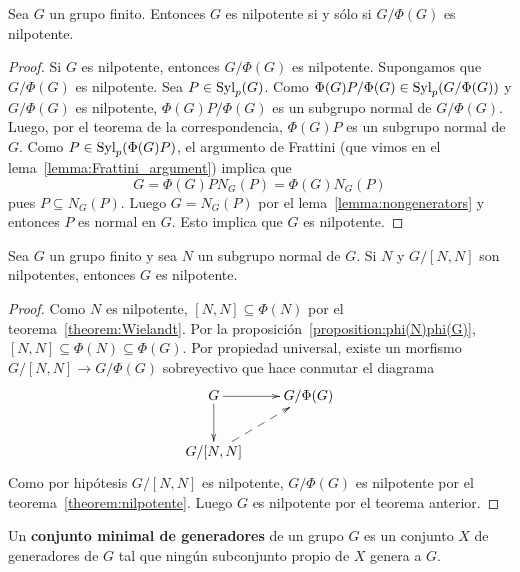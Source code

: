 \begin{theorem}
	\label{theorem:G/phi(G)}
	Sea $G$ un grupo finito. Entonces $G$ es nilpotente si y sólo si
	$G/\Phi(G)$ es nilpotente.
\end{theorem}
\begin{proof}
	Si $G$ es nilpotente, entonces $G/\Phi(G)$ es nilpotente. Supongamos que $G/\Phi(G)$ es
	nilpotente. Sea $P\in\mathrm{Syl}_p(G)$. Como
	$\Phi(G)P/\Phi(G)\in\mathrm{Syl}_p(G/\Phi(G))$ y $G/\Phi(G)$ es nilpotente,
	$\Phi(G)P/\Phi(G)$ es un subgrupo normal de $G/\Phi(G)$. Luego, por el
	teorema de la correspondencia, $\Phi(G)P$ es un subgrupo normal de $G$.
	Como $P\in\mathrm{Syl}_p(\Phi(G)P)$, el argumento de Frattini 
	(que vimos en el lema~\ref{lemma:Frattini_argument}) implica que
	\[
		G=\Phi(G)PN_G(P)=\Phi(G)N_G(P)
	\]
	pues $P\subseteq N_G(P)$. Luego $G=N_G(P)$ por el
	lema~\ref{lemma:nongenerators} y entonces $P$ es normal en $G$. Esto
	implica que $G$ es nilpotente.
\end{proof}

\begin{theorem}[Hall]
	\label{theorem:Hall_nilpotente}
	Sea $G$ un grupo finito y sea $N$ un subgrupo normal de $G$. Si $N$ y
	$G/[N,N]$ son nilpotentes, entonces $G$ es nilpotente.
\end{theorem}

\begin{proof}
	Como $N$ es nilpotente, $[N,N]\subseteq\Phi(N)$ por el
	teorema~\ref{theorem:Wielandt}.	
	Por la proposición~\ref{proposition:phi(N)phi(G)},
	$[N,N]\subseteq\Phi(N)\subseteq\Phi(G)$. 
	Por propiedad universal, existe un morfismo
	$G/[N,N]\to G/\Phi(G)$ sobreyectivo que hace conmutar el diagrama
    \[
	\xymatrix{
	G
	\ar[d]
	\ar[r]
	& G/\Phi(G)
	\\
	G/[N,N]\ar@{-->}[ur]
	}
    \]
	Como por hipótesis $G/[N,N]$ es nilpotente, $G/\Phi(G)$ es nilpotente por
	el teorema~\ref{theorem:nilpotente}. Luego $G$ es nilpotente por el
	teorema anterior. %
\end{proof}

\begin{definition}
	Un \textbf{conjunto minimal de generadores} de un grupo $G$ es un conjunto
	$X$ de generadores de $G$ tal que ningún subconjunto propio de $X$ genera a
	$G$.
\end{definition}

